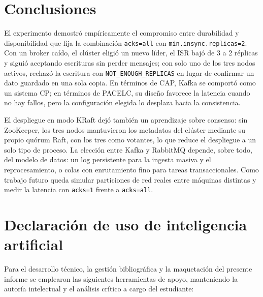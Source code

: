 \documentclass[12pt,a4paper]{article}
\begin{document}
\section{Conclusiones}\label{sec:conclusiones}
El experimento demostró empíricamente el compromiso entre durabilidad y disponibilidad que fija la combinación \texttt{acks=all} con \texttt{min.insync.replicas=2}. Con un broker caído, el clúster eligió un nuevo líder, el ISR bajó de 3 a 2 réplicas y siguió aceptando escrituras sin perder mensajes; con solo uno de los tres nodos activos, rechazó la escritura con \texttt{NOT\_ENOUGH\_REPLICAS} en lugar de confirmar un dato guardado en una sola copia. En términos de CAP, Kafka se comportó como un sistema CP; en términos de PACELC, su diseño favorece la latencia cuando no hay fallos, pero la configuración elegida lo desplaza hacia la consistencia.

El despliegue en modo KRaft dejó también un aprendizaje sobre consenso: sin ZooKeeper, los tres nodos mantuvieron los metadatos del clúster mediante su propio quórum Raft, con los tres como votantes, lo que reduce el despliegue a un solo tipo de proceso. La elección entre Kafka y RabbitMQ depende, sobre todo, del modelo de datos: un log persistente para la ingesta masiva y el reprocesamiento, o colas con enrutamiento fino para tareas transaccionales. Como trabajo futuro queda simular particiones de red reales entre máquinas distintas y medir la latencia con \texttt{acks=1} frente a \texttt{acks=all}.

\section{Declaración de uso de inteligencia artificial}

Para el desarrollo técnico, la gestión bibliográfica y la maquetación del presente informe se emplearon las siguientes herramientas de apoyo, manteniendo la autoría intelectual y el análisis crítico a cargo del estudiante:
\end{document}
